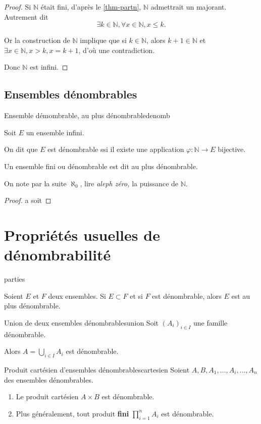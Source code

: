 \documentclass[a4paper,french,final]{memoir}
\begin{document}
\begin{proof}
	Si $\mathbb{N}$ était fini, d'après le \cref{thm-partn}, $\mathbb{N}$ admettrait un majorant. Autrement dit \[\exists k \in \mathbb{N}, \forall x \in \mathbb{N}, x \leq k.\]

	Or la construction de $\mathbb{N}$ implique que si $ k \in \mathbb{N}$, alors $k + 1 \in \mathbb{N}$ et $\exists x \in \mathbb{N}, x > k, x= k+1$, d'où une contradiction. 
	
	Donc $\mathbb{N}$ est infini.
\end{proof}

\section{Ensembles dénombrables}

\begin{defb}{Ensemble démombrable, au plus dénombrable}{denomb}

	 Soit $E$ un ensemble infini. 
	 
	 On dit que $E$ est dénombrable ssi il existe une application $\varphi : \mathbb{N} \to E $ bijective. 
	 
	 Un ensemble fini ou dénombrable est dit au plus dénombrable. 
\end{defb}

On note par la suite $\aleph_0$, lire \emph{aleph zéro,} la puissance de $\mathbb{N}$. 

\begin{proof}
a
soit
\end{proof}

\chapter{Propriétés usuelles de dénombrabilité}

\begin{theoremb}{}{parties}

	Soient $E$ et $F$ deux ensembles. 
	Si $E \subset F$ et si $F$ est dénombrable, alors $E$ est au plus dénombrable.
\end{theoremb}

\begin{theoremb}{Union de deux ensembles dénombrables}{union}
    Soit $(A_i)_{i \in I}$ une famille dénombrable. 
	
	Alors $A= \bigcup_{i \in I} A_i$ est dénombrable. 
\end{theoremb}


\begin{theoremb}{Produit cartésien d'ensembles dénombrables}{cartesien}
	Soient $A, B, A_1, \dots, A_i, \dots, A_n$ des ensembles dénombrables. 
	
	\begin{enumerate}
		\item Le produit cartésien $A \times B$ est dénombrable. 
		\item Plus généralement, tout produit \textbf{fini} $\prod_{i=1}^{n} A_i $ est dénombrable.
	\end{enumerate}
\end{theoremb}
\end{document}

